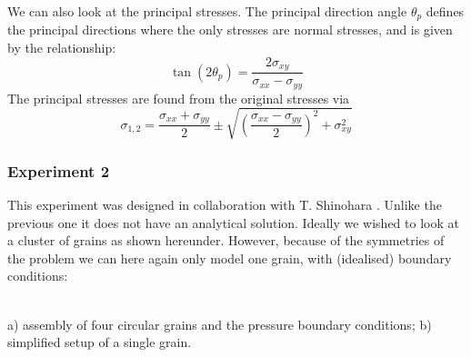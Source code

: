We can also look at the principal stresses.
The principal direction angle $\theta_p$ defines the principal
directions where the only stresses are normal stresses, and 
is given by the relationship:
\[
\tan (2\theta_p) =  \frac{2 \sigma_{xy}}{\sigma_{xx} -\sigma_{yy}}
\]
The principal stresses are found from the original stresses via
 \[
\sigma_{1,2}=\frac{\sigma_{xx}+\sigma_{yy}}{2} \pm \sqrt{  \left(\frac{\sigma_{xx}-\sigma_{yy}}{2}\right)^2 +\sigma_{xy}^2 }
 \]



\newpage
\subsubsection*{Experiment 2}

This experiment was designed in collaboration with T. Shinohara . 
Unlike the previous one it does not have an analytical solution. Ideally we wished to look at a 
cluster of grains as shown hereunder. However, because of the symmetries of the problem we can 
here again only model one grain, with (idealised) boundary conditions:
 
\begin{center}
\\
{\captionfont a) assembly of four circular grains and the pressure boundary conditions; 
b) simplified setup of a single grain.}
\end{center}

